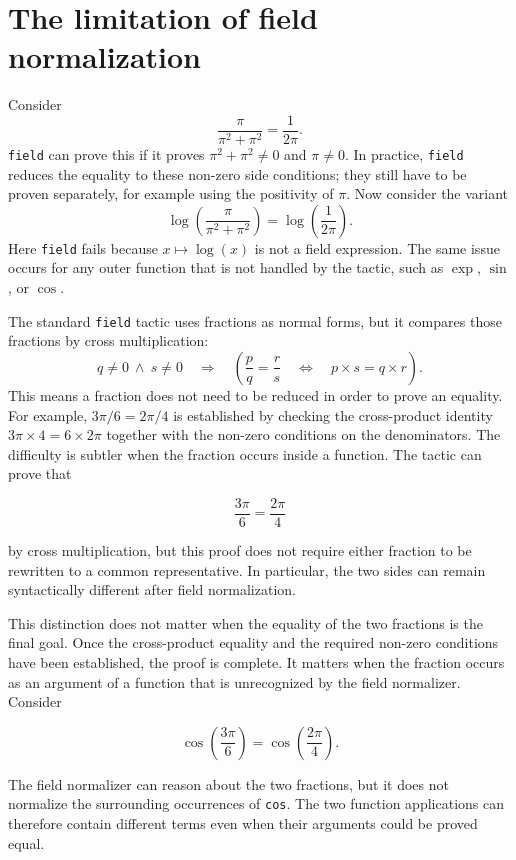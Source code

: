 \documentclass[11pt]{article}
\begin{document}
\section{The limitation of field normalization}
Consider
\[
  \frac{\pi}{\pi^2+\pi^2}=\frac{1}{2\pi}.
\]
\texttt{field} can prove this if it proves $\pi^2+\pi^2\ne0$ and
$\pi\ne0$.
In practice, \texttt{field} reduces the equality to these non-zero side conditions; they still have to be proven separately, for example using the positivity of
$\pi$.
Now consider the variant
\[
  \log\!\left(\frac{\pi}{\pi^2+\pi^2}\right)
  = \log\!\left(\frac{1}{2\pi}\right).
\]
Here \texttt{field} fails because $x\mapsto\log(x)$ is not a field
expression. The same issue occurs for any outer function that is not handled by the tactic, such as $\exp$, $\sin$, or $\cos$.


The standard \texttt{field} tactic uses fractions as normal forms, but it compares
those fractions by cross multiplication:
\[
  q\ne0\ \land\ s\ne0
  \quad\Longrightarrow\quad
  \left(\frac{p}{q}=\frac{r}{s}
  \quad\Longleftrightarrow\quad
  p\times s=q\times r\right).
\]
This means a fraction does not need to be reduced in order to prove an equality.
For example, $3\pi/6=2\pi/4$ is established by checking the cross-product
identity $3\pi\times4=6\times2\pi$ together with the non-zero conditions on the
denominators.
The difficulty is subtler when the fraction occurs inside a function. The
tactic can prove that

$$
  \frac{3\pi}{6}=\frac{2\pi}{4}
$$

by cross multiplication, but this proof does not require either fraction to
be rewritten to a common representative. In particular, the two sides can
remain syntactically different after field normalization.

This distinction does not matter when the equality of the two fractions is
the final goal. Once the cross-product equality and the required non-zero
conditions have been established, the proof is complete. It matters when the
fraction occurs as an argument of a function that is unrecognized by the field
normalizer. Consider

$$
  \cos\left(\frac{3\pi}{6}\right)
  =
  \cos\left(\frac{2\pi}{4}\right).
$$

The field normalizer can reason about the two fractions, but it does not
normalize the surrounding occurrences of \texttt{cos}. The two function
applications can therefore contain different terms even when their
arguments could be proved equal.
\end{document}
